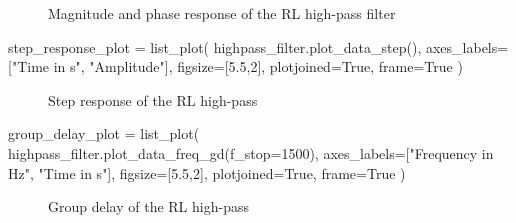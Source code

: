 \begin{figure}[H]
    \centering
    \begin{subfigure}{\textwidth}
        \centering
    \end{subfigure}
    \quad
    \begin{subfigure}{\textwidth}
        \centering
    \end{subfigure}
    \caption{Magnitude and phase response of the RL high-pass filter}
\end{figure}

\begin{sagesilent}
    step_response_plot = list_plot(
        highpass_filter.plot_data_step(),
        axes_labels=["Time in s", "Amplitude"],
        figsize=[5.5,2],
        plotjoined=True,
        frame=True
    )
\end{sagesilent}

\begin{figure}[H]
    \centering
    \caption{Step response of the RL high-pass}
\end{figure}

\begin{sagesilent}
    group_delay_plot = list_plot(
        highpass_filter.plot_data_freq_gd(f_stop=1500),
        axes_labels=["Frequency in Hz", "Time in s"],
        figsize=[5.5,2],
        plotjoined=True,
        frame=True
    )
\end{sagesilent}

\begin{figure}[H]
    \centering
    \caption{Group delay of the RL high-pass}
\end{figure}